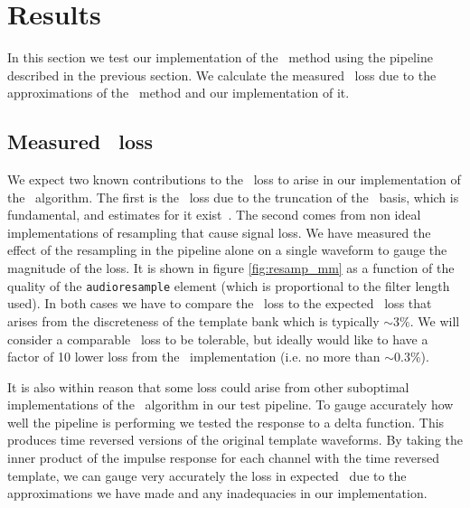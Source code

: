 \section{Results}
\label{SECIV}\label{sec:results}

In this section we test our implementation of the \lloid\ method using the
pipeline described in the previous section.  We calculate the measured \SNR\
loss due to the approximations of the \lloid\ method and our implementation of
it.
%
%
%


\subsection{Measured \SNR\ loss}

We expect two known contributions to the \SNR\ loss to arise in our
implementation of the \lloid\ algorithm.  The first is the \SNR\ loss due to
the truncation of the \SVD\ basis, which is fundamental, and estimates for it
exist~\cite{Cannon:2010p10398}.  The second comes from non ideal
implementations of resampling that cause signal loss.  We have measured the
effect of the resampling in the pipeline alone on a single waveform to gauge
the magnitude of the loss.  It is shown in figure \ref{fig:resamp_mm} as a
function of the quality of the {\tt audioresample} element (which is
proportional to the filter length used).  In both cases we have to compare the
\SNR\ loss to the expected \SNR\ loss that arises from the discreteness of the
template bank which is typically $\sim 3\%$.  We will consider a comparable
\SNR\ loss to be tolerable, but ideally would like to have a factor of 10 lower
loss from the \lloid\ implementation (i.e. no more than $\sim 0.3 \%$).

It is also within reason that some \SNR loss could arise from other suboptimal
implementations of the \lloid\ algorithm in our test pipeline.  To gauge
accurately how well the pipeline is performing we tested the response to a
delta function.  This produces time reversed versions of the original template
waveforms. By taking the inner product of the impulse response for each channel
with the time reversed template, we can gauge very accurately the loss in
expected \SNR\ due to the approximations we have made and any inadequacies in
our implementation. 

